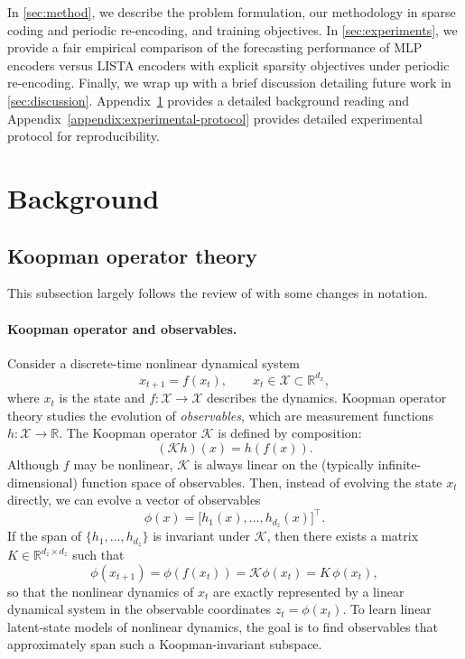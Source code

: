 In \cref{sec:method}, we describe the problem formulation, our methodology in sparse coding and periodic re-encoding, and training objectives. 
In \cref{sec:experiments}, we provide a fair empirical comparison of the forecasting performance of MLP encoders versus LISTA encoders with explicit sparsity objectives under periodic re-encoding.
Finally, we wrap up with a brief discussion detailing future work in \cref{sec:discussion}. Appendix~\ref{sec:background} provides a detailed background reading and Appendix~\ref{appendix:experimental-protocol} provides detailed experimental protocol for reproducibility.

\section{Background}
\label{sec:background}

\subsection{Koopman operator theory}
\label{sec:koopman-background}

This subsection largely follows the review of \citet{brunton_modern_2022} with some changes in notation. 

\paragraph{Koopman operator and observables.}
Consider a discrete-time nonlinear dynamical system
\begin{equation}
x_{t+1} = f(x_t), \qquad x_t \in \mathcal{X} \subset \mathbb{R}^{d_x},
\end{equation}
where $x_t$ is the state and $f : \mathcal{X} \to \mathcal{X}$ describes the dynamics.
Koopman operator theory studies the evolution of \emph{observables}, which are measurement functions $h : \mathcal{X} \to \mathbb{R}$.
The Koopman operator $\mathcal{K}$ is defined by composition:
\begin{equation}
(\mathcal{K}h)(x) = h(f(x)).
\end{equation}
Although $f$ may be nonlinear, $\mathcal{K}$ is always linear on the (typically infinite-dimensional) function space of observables. Then, instead of evolving the state $x_t$ directly, we can evolve a vector of observables
\begin{equation}
\phi(x) = \big[h_1(x), \dots, h_{d_z}(x)\big]^\top.
\end{equation}
If the span of $\{h_1,\dots,h_{d_z}\}$ is invariant under $\mathcal{K}$, 
then there exists a matrix
$K \in \mathbb{R}^{d_z \times d_z}$ such that
\begin{equation}
\phi(x_{t+1}) = \phi(f(x_t)) = \mathcal{K}\phi(x_t) = K\, \phi(x_t),
\end{equation}
so that the nonlinear dynamics of $x_t$ are exactly represented by a linear dynamical system
in the observable coordinates $z_t = \phi(x_t)$.
To learn linear latent-state models of nonlinear dynamics, the goal is to find observables that approximately span such a Koopman-invariant subspace.

